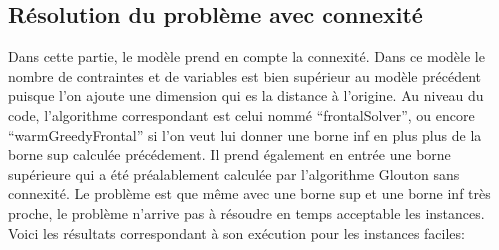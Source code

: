 \documentclass[a4paper, 11pt]{article} %
\begin{document}
\begin{comment}
  $20\_25\_1$ &  & &  \\ \hline 
  $20\_25\_2$ &  & &  \\ \hline
  $20\_25\_3$ &  & &  \\ \hline
  $20\_25\_4$ &  & &  \\ \hline
  $20\_25\_5$ &  & &  \\ \hline
  $20\_25\_6$ &  & &  \\ \hline
  $20\_25\_7$ &  & &  \\ \hline
  $20\_25\_8$ &  & &  \\ \hline
  $20\_25\_9$ &  & &  \\ \hline
  $20\_25\_10$ &  & &  \\ \hline
  
  $25\_30\_1$ &  & &  \\ \hline
  $25\_30\_2$ &  & &  \\ \hline 
  $25\_30\_3$ &  & &  \\ \hline 
  $25\_30\_4$ &  & &  \\ \hline 
  $25\_30\_5$ &  & &  \\ \hline 
  $25\_30\_6$ &  & &  \\ \hline 
  $25\_30\_7$ &  & &  \\ \hline 
  $25\_30\_8$ &  & &  \\ \hline 
  $25\_30\_9$ &  & &  \\ \hline 
  $25\_30\_10$ &  & &  \\ \hline 
 
\end{tabular}
\end{center}
\end{comment}


\subsection{Résolution du problème avec connexité}

Dans cette partie, le modèle prend en compte la connexité. Dans ce modèle le nombre de contraintes et de variables est bien supérieur au modèle précédent puisque l'on ajoute une dimension qui es la distance à l'origine. Au niveau du code, l'algorithme correspondant est celui nommé ``frontalSolver'', ou encore ``warmGreedyFrontal'' si l'on veut lui donner une borne inf en plus plus de la borne sup calculée précédement. Il prend également en entrée une borne supérieure qui a été préalablement calculée par l'algorithme Glouton sans connexité. Le problème est que même avec une borne sup et une borne inf très proche, le problème n'arrive pas à résoudre en temps acceptable les instances. Voici les résultats correspondant à son exécution pour les instances faciles:
\end{document}
